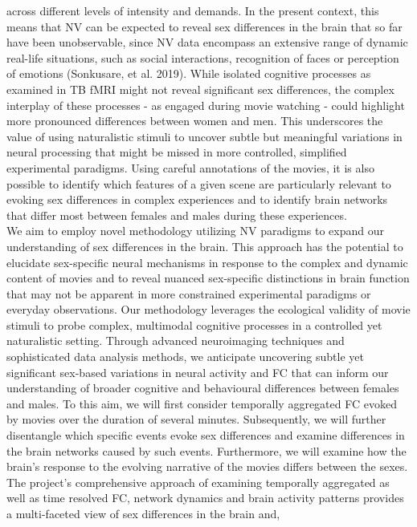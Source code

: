\documentclass[11pt,a4paper]{article}
\begin{document}
across different levels of intensity and demands. In the present context, this means that NV can be expected 
to reveal sex differences in the brain that so far have been unobservable, since NV data encompass an extensive 
range of dynamic real-life situations, such as social interactions, recognition of faces or perception of 
emotions (Sonkusare, et al. 2019). While isolated cognitive processes as examined in TB fMRI might not reveal 
significant sex differences, the complex interplay of these processes - as engaged during movie watching - could 
highlight more pronounced differences between women and men. This underscores the value of using naturalistic stimuli 
to uncover subtle but meaningful variations in neural processing that might be missed in more controlled, simplified 
experimental paradigms. Using careful annotations of the movies, it is also possible to identify which features 
of a given scene are particularly relevant to evoking sex differences in complex experiences and to identify 
brain networks that differ most between females and males during these experiences.\\
We aim to employ novel methodology utilizing NV paradigms to expand our understanding of sex differences in the 
brain. This approach has the potential to elucidate sex-specific neural mechanisms in response to the complex and 
dynamic content of movies and to reveal nuanced sex-specific distinctions in brain function that may not be apparent 
in more constrained experimental paradigms or everyday observations. Our methodology leverages the ecological 
validity of movie stimuli to probe complex, multimodal cognitive processes in a controlled yet naturalistic setting. 
Through advanced neuroimaging techniques and sophisticated data analysis methods, we anticipate uncovering 
subtle yet significant sex-based variations in neural activity and FC that can inform our understanding of 
broader cognitive and behavioural differences between females and males. To this aim, we will first consider 
temporally aggregated FC evoked by movies over the duration of several minutes. Subsequently, we will further 
disentangle which specific events evoke sex differences and examine differences in the brain networks caused by 
such events. Furthermore, we will examine how the brain’s response to the evolving narrative of the movies differs 
between the sexes. The project's comprehensive approach of examining temporally aggregated as well as time resolved FC, 
network dynamics and brain activity patterns provides a multi-faceted view of sex differences in the brain and, 
\end{document}

